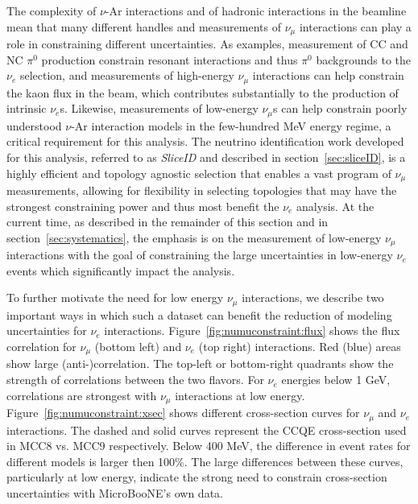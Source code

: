 \documentclass[a4paper]{article}
\begin{document}
\par The complexity of $\nu$-Ar interactions and of hadronic interactions in the beamline mean that many different handles and measurements of $\nu_{\mu}$ interactions can play a role in constraining different uncertainties. As examples, measurement of CC and NC $\pi^0$ production constrain resonant interactions and thus $\pi^0$ backgrounds to the $\nu_e$ selection, and measurements of high-energy $\nu_{\mu}$ interactions can help constrain the kaon flux in the beam, which contributes substantially to the production of intrinsic $\nu_e$s. Likewise, measurements of low-energy $\nu_{\mu}$s can help constrain poorly understood $\nu$-Ar interaction models in the few-hundred MeV energy regime, a critical requirement for this analysis. The neutrino identification work developed for this analysis, referred to as \emph{SliceID} and described in section~\ref{sec:sliceID}, is a highly efficient and topology agnostic selection that enables a vast program of $\nu_{\mu}$ measurements, allowing for flexibility in selecting topologies that may have the strongest constraining power and thus most benefit the $\nu_e$ analysis. At the current time, as described in the remainder of this section and in section~\ref{sec:systematics}, the emphasis is on the measurement of low-energy $\nu_{\mu}$ interactions with the goal of constraining the large uncertainties in low-energy $\nu_e$ events which significantly impact the analysis.
\par To further motivate the need for low energy $\nu_{\mu}$ interactions, we describe two important ways in which such a dataset can benefit the reduction of modeling uncertainties for $\nu_e$ interactions. Figure~\ref{fig:numuconstraint:flux} shows the flux correlation for $\nu_{\mu}$ (bottom left) and $\nu_e$ (top right) interactions. Red (blue) areas show large (anti-)correlation. The top-left or bottom-right quadrants show the strength of correlations between the two flavors. For $\nu_e$ energies below 1 GeV, correlations are strongest with $\nu_{\mu}$ interactions at low energy. Figure~\ref{fig:numuconstraint:xsec} shows different cross-section curves for $\nu_{\mu}$ and $\nu_e$ interactions. The dashed and solid curves represent the CCQE cross-section used in MCC8 vs. MCC9 respectively. Below 400 MeV, the difference in event rates for different models is larger then 100\%. The large differences between these curves, particularly at low energy, indicate the strong need to constrain cross-section uncertainties with MicroBooNE's own data. 
\end{document}
